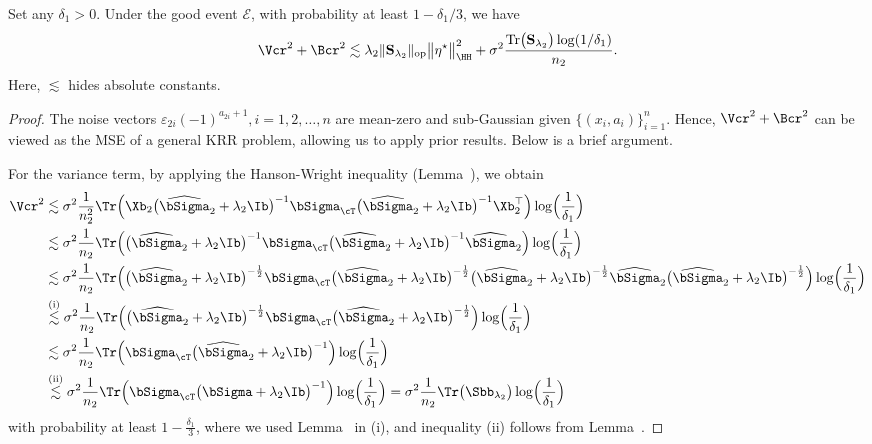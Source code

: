\documentclass[12pt,a4paper,pdftex,onepage]{article}
\newcommand{\Sighat}{\widehat{{\bSigma}}}
\newcommand{\op}{\operatorname{op}}
\newcommand{\sig}{\sigma}
\newcommand{\Sbar}{\mathbf{S}}
\newcommand{\event}{\mathscr{E}}
\begin{document}
\begin{lemma}\label{lemma; RA learner bound 1}
Set any \(\delta_1>0\).
Under the good event \(\event\), with probability at least \(1- \delta_1/3\), we have
\[
\Vcr^2 + \Bcr^2 \lesssim  \lambda_2\|\Sbar_{\lambda_2}  \|_{\op}\bigl\|\eta^{\star}\bigr\|_{\HH}^2+\sig^2 \frac{ \operatorname{Tr}\bigl(\Sbar_{\lambda_2}\bigr) \log (1 / \delta_1)}{n_2}.
\]
Here, \(\lesssim\) hides absolute constants.
\end{lemma}

\begin{proof}
The noise vectors \(\varepsilon_{2i}(-1)^{a_{2i}+1}, i =1,2,\dots,n\) are mean-zero and sub-Gaussian given \(\{(x_i,a_i) \}_{i=1}^n\). 
Hence, \(\Vcr^2 + \Bcr^2\) can be viewed as the MSE of a general KRR problem, allowing us to apply prior results.
Below is a brief argument. 

For the variance term, by applying the Hanson-Wright inequality (Lemma~), we obtain
\begin{align*}
\Vcr^2 
&\lesssim \sigma^2 \frac{1}{n_2^2}\Tr\Bigl( \Xb_2 \bigl(\Sighat_2 + \lambda_2 \Ib\bigr)^{-1} \bSigma_\cT \bigl(\Sighat_2 + \lambda_2 \Ib\bigr)^{-1} \Xb_2^\top \Bigr) \log\Bigl(\frac{1}{\delta_1}\Bigr)\\
&\lesssim \sigma^2 \frac{1}{n_2}\Tr\Bigl( \bigl(\Sighat_2 + \lambda_2 \Ib\bigr)^{-1} \bSigma_\cT \bigl(\Sighat_2 + \lambda_2 \Ib\bigr)^{-1}\Sighat_2\Bigr)\log\Bigl(\frac{1}{\delta_1}\Bigr)\\
&\lesssim \sigma^2 \frac{1}{n_2}\Tr\Bigl( \bigl(\Sighat_2 + \lambda_2 \Ib\bigr)^{-\frac{1}{2}} \bSigma_\cT \bigl(\Sighat_2 + \lambda_2 \Ib\bigr)^{-\frac{1}{2}} 
\bigl(\Sighat_2 + \lambda_2 \Ib\bigr)^{-\frac{1}{2}} \Sighat_2 \bigl(\Sighat_2 + \lambda_2 \Ib\bigr)^{-\frac{1}{2}}\Bigr) \log\Bigl(\frac{1}{\delta_1}\Bigr)\\
&\stackrel{\text{(i)}}{\lesssim} \sigma^2 \frac{1}{n_2}\Tr\Bigl( \bigl(\Sighat_2 + \lambda_2 \Ib\bigr)^{-\frac{1}{2}} \bSigma_\cT \bigl(\Sighat_2 + \lambda_2 \Ib\bigr)^{-\frac{1}{2}}\Bigr)\log\Bigl(\frac{1}{\delta_1}\Bigr)\\
&\lesssim \sigma^2 \frac{1}{n_2}\Tr\Bigl(\bSigma_\cT \bigl(\Sighat_2 + \lambda_2 \Ib\bigr)^{-1}\Bigr)\log\Bigl(\frac{1}{\delta_1}\Bigr)\\
& \stackrel{\text{(ii)}}{\lesssim} \sigma^2  \frac{1}{n_2}\Tr\Bigl(\bSigma_\cT \bigl(\bSigma + \lambda_2 \Ib\bigr)^{-1}\Bigr)\log\Bigl(\frac{1}{\delta_1}\Bigr)
=\sigma^2\frac{1}{n_2}\Tr\bigl(\Sbb_{\lambda_2}\bigr)\log\Bigl(\frac{1}{\delta_1}\Bigr)
\end{align*}
with probability at least \(1-\frac{\delta_1}{3}\), where we used 
Lemma~ in (i), 
and inequality (ii) follows from 
Lemma~.


\end{proof}
\end{document}
